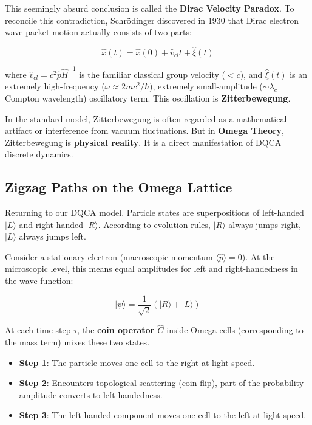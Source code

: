This seemingly absurd conclusion is called the \textbf{Dirac Velocity Paradox}. To reconcile this contradiction, Schr\"{o}dinger discovered in 1930 that Dirac electron wave packet motion actually consists of two parts:

\[\hat{x}(t) = \hat{x}(0) + \hat{v}_{cl} t + \hat{\xi}(t)\]

where $\hat{v}_{cl} = c^2 \hat{p} \hat{H}^{-1}$ is the familiar classical group velocity ($< c$), and $\hat{\xi}(t)$ is an extremely high-frequency ($\omega \approx 2mc^2/\hbar$), extremely small-amplitude ($\sim \lambda_c$ Compton wavelength) oscillatory term. This oscillation is \textbf{Zitterbewegung}.

In the standard model, Zitterbewegung is often regarded as a mathematical artifact or interference from vacuum fluctuations. But in \textbf{Omega Theory}, Zitterbewegung is \textbf{physical reality}. It is a direct manifestation of DQCA discrete dynamics.

\subsection{Zigzag Paths on the Omega Lattice}

Returning to our DQCA model. Particle states are superpositions of left-handed $|L\rangle$ and right-handed $|R\rangle$.
According to evolution rules, $|R\rangle$ always jumps right, $|L\rangle$ always jumps left.

Consider a stationary electron (macroscopic momentum $\langle \hat{p} \rangle = 0$). At the microscopic level, this means equal amplitudes for left and right-handedness in the wave function:

\[|\psi\rangle = \frac{1}{\sqrt{2}} (|R\rangle + |L\rangle)\]

At each time step $\tau$, the \textbf{coin operator $\hat{C}$} inside Omega cells (corresponding to the mass term) mixes these two states.

\begin{itemize}
\item \textbf{Step 1}: The particle moves one cell to the right at light speed.
\item \textbf{Step 2}: Encounters topological scattering (coin flip), part of the probability amplitude converts to left-handedness.
\item \textbf{Step 3}: The left-handed component moves one cell to the left at light speed.
\end{itemize}

